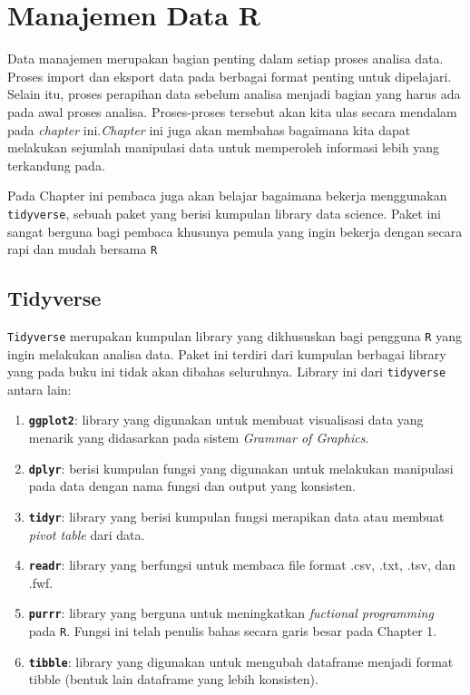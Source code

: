 \documentclass[]{book}
\providecommand{\tightlist}{%
  \setlength{\itemsep}{0pt}\setlength{\parskip}{0pt}}
\begin{document}
\chapter{Manajemen Data R}\label{manajemen-data-r}

Data manajemen merupakan bagian penting dalam setiap proses analisa
data. Proses import dan eksport data pada berbagai format penting untuk
dipelajari. Selain itu, proses perapihan data sebelum analisa menjadi
bagian yang harus ada pada awal proses analisa. Proses-proses tersebut
akan kita ulas secara mendalam pada \emph{chapter} ini.\emph{Chapter}
ini juga akan membahas bagaimana kita dapat melakukan sejumlah
manipulasi data untuk memperoleh informasi lebih yang terkandung pada.

Pada Chapter ini pembaca juga akan belajar bagaimana bekerja menggunakan
\texttt{tidyverse}, sebuah paket yang berisi kumpulan library data
science. Paket ini sangat berguna bagi pembaca khusunya pemula yang
ingin bekerja dengan secara rapi dan mudah bersama \texttt{R}

\section{Tidyverse}\label{tidyverse}

\texttt{Tidyverse} merupakan kumpulan library yang dikhususkan bagi
pengguna \texttt{R} yang ingin melakukan analisa data. Paket ini terdiri
dari kumpulan berbagai library yang pada buku ini tidak akan dibahas
seluruhnya. Library ini dari \texttt{tidyverse} antara lain:

\begin{enumerate}
\def\labelenumi{\arabic{enumi}.}
\tightlist
\item
  \textbf{\texttt{ggplot2}}: library yang digunakan untuk membuat
  visualisasi data yang menarik yang didasarkan pada sistem
  \emph{Grammar of Graphics}.
\item
  \textbf{\texttt{dplyr}}: berisi kumpulan fungsi yang digunakan untuk
  melakukan manipulasi pada data dengan nama fungsi dan output yang
  konsisten.
\item
  \textbf{\texttt{tidyr}}: library yang berisi kumpulan fungsi merapikan
  data atau membuat \emph{pivot table} dari data.
\item
  \textbf{\texttt{readr}}: library yang berfungsi untuk membaca file
  format .csv, .txt, .tsv, dan .fwf.
\item
  \textbf{\texttt{purrr}}: library yang berguna untuk meningkatkan
  \emph{fuctional programming} pada \texttt{R}. Fungsi ini telah penulis
  bahas secara garis besar pada Chapter 1.
\item
  \textbf{\texttt{tibble}}: library yang digunakan untuk mengubah
  dataframe menjadi format tibble (bentuk lain dataframe yang lebih
  konsisten).
\end{enumerate}
\end{document}
